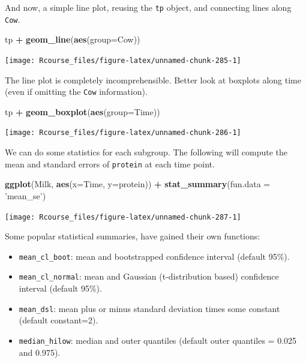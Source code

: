 \documentclass[]{book}
\newenvironment{Shaded}{\begin{snugshade}}{\end{snugshade}}
\newcommand{\DataTypeTok}[1]{\textcolor[rgb]{0.13,0.29,0.53}{#1}}
\newcommand{\KeywordTok}[1]{\textcolor[rgb]{0.13,0.29,0.53}{\textbf{#1}}}
\newcommand{\NormalTok}[1]{#1}
\newcommand{\OperatorTok}[1]{\textcolor[rgb]{0.81,0.36,0.00}{\textbf{#1}}}
\newcommand{\StringTok}[1]{\textcolor[rgb]{0.31,0.60,0.02}{#1}}
\providecommand{\tightlist}{%
  \setlength{\itemsep}{0pt}\setlength{\parskip}{0pt}}
\theoremstyle{definition}
\theoremstyle{definition}
\theoremstyle{definition}
\theoremstyle{remark}
\begin{document}
And now, a simple line plot, reusing the \texttt{tp} object, and connecting lines along \texttt{Cow}.

\begin{Shaded}
\begin{Highlighting}[]
\NormalTok{tp }\OperatorTok{+}\StringTok{ }\KeywordTok{geom_line}\NormalTok{(}\KeywordTok{aes}\NormalTok{(}\DataTypeTok{group=}\NormalTok{Cow))}
\end{Highlighting}
\end{Shaded}

\texttt{[image: Rcourse\_files/figure-latex/unnamed-chunk-285-1]}

The line plot is completely incomprehensible.
Better look at boxplots along time (even if omitting the \texttt{Cow} information).

\begin{Shaded}
\begin{Highlighting}[]
\NormalTok{tp }\OperatorTok{+}\StringTok{ }\KeywordTok{geom_boxplot}\NormalTok{(}\KeywordTok{aes}\NormalTok{(}\DataTypeTok{group=}\NormalTok{Time))}
\end{Highlighting}
\end{Shaded}

\texttt{[image: Rcourse\_files/figure-latex/unnamed-chunk-286-1]}

We can do some statistics for each subgroup.
The following will compute the mean and standard errors of \texttt{protein} at each time point.

\begin{Shaded}
\begin{Highlighting}[]
\KeywordTok{ggplot}\NormalTok{(Milk, }\KeywordTok{aes}\NormalTok{(}\DataTypeTok{x=}\NormalTok{Time, }\DataTypeTok{y=}\NormalTok{protein)) }\OperatorTok{+}
\StringTok{  }\KeywordTok{stat_summary}\NormalTok{(}\DataTypeTok{fun.data =} \StringTok{'mean_se'}\NormalTok{)}
\end{Highlighting}
\end{Shaded}

\texttt{[image: Rcourse\_files/figure-latex/unnamed-chunk-287-1]}

Some popular statistical summaries, have gained their own functions:

\begin{itemize}
\tightlist
\item
  \texttt{mean\_cl\_boot}: mean and bootstrapped confidence interval (default 95\%).
\item
  \texttt{mean\_cl\_normal}: mean and Gaussian (t-distribution based) confidence interval (default 95\%).
\item
  \texttt{mean\_dsl}: mean plus or minus standard deviation times some constant (default constant=2).
\item
  \texttt{median\_hilow}: median and outer quantiles (default outer quantiles = 0.025 and 0.975).
\end{itemize}
\end{document}
